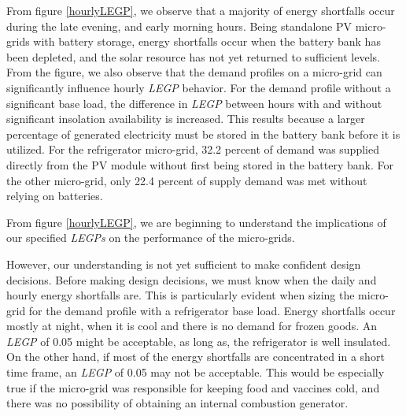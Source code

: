 \documentclass{article}
\begin{document}
From figure \ref{hourlyLEGP}, we observe that a majority of energy shortfalls occur during the late evening, and early morning hours. 
Being standalone PV micro-grids with battery storage, energy shortfalls occur when the battery bank has been depleted, and the solar resource has not yet returned to sufficient levels.
From the figure, we also observe that the demand profiles on a micro-grid can significantly influence hourly \emph{LEGP} behavior. 
For the demand profile without a significant base load, the difference in \emph{LEGP} between hours with and without significant insolation availability is increased. 
This results because a larger percentage of generated electricity must be stored in the battery bank before it is utilized. 
For the refrigerator micro-grid, 32.2 percent of demand was supplied directly from the PV module without first being stored in the battery bank. 
For the other micro-grid, only 22.4 percent of supply demand was met without relying on batteries. 


From figure \ref{hourlyLEGP}, we are beginning to understand the implications of our specified \emph{LEGPs} on the performance of the micro-grids.  


However, our understanding is not yet sufficient to make confident design decisions.
Before making design decisions, we must know when the daily and hourly energy shortfalls are. 
This is particularly evident when sizing the micro-grid for the demand profile with a refrigerator base load.  
Energy shortfalls occur mostly at night, when it is cool and there is no demand for frozen goods. 
An \emph{LEGP} of 0.05 might be acceptable, as long as, the refrigerator is well insulated. 
On the other hand, if most of the energy shortfalls are concentrated in a short time frame, an \emph{LEGP} of 0.05 may not be acceptable. 
This would be especially true if the micro-grid was responsible for keeping food and vaccines cold, and there was no possibility of obtaining an internal combustion generator. 
\end{document}
